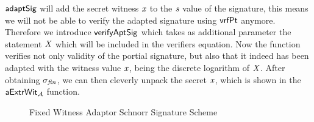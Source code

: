 $\mathsf{adaptSig}$ will add the secret witness $\mathit{x}$ to the $\mathit{s}$ value of the signature, this means we will not be able to verify the adapted signature using $\mathsf{vrfPt}$ anymore. Therefore we
introduce $\mathsf{verifyAptSig}$ which takes as additional parameter the statement $\mathit{X}$ which will be included in the verifiers equation. Now the function verifies not only validity of the portial
signature, but also that it indeed has been adapted with the witness value $\mathit{x}$, being the discrete logarithm of $\mathit{X}$. After obtaining $\sigma_{\mathit{fin}}$, we can then cleverly unpack the secret $\mathit{x}$,
which is shown in the $\mathsf{aExtrWit_{\mathcal{A}}}$ function.

\begin{figure}
    \begin{center}
        \fbox{
        \begin{varwidth}{\textwidth}
            \procedure[linenumbering]{$\procAptSig{\varSigPt}{\varWit}$}{
            (\varS \opSeperate \varRandAlice \opSeperate \varSigContext) \opFunResult \varSigPt \\
            \varSStar \opAssign \varS \opAddScalar \varWit \\
            \pcreturn \varSigApt \opAssign (\varSStar \opSeperate \varRandAlice \opSeperate \varSigContext)
            } \\
            \procedure[linenumbering]{$\procVerifyAptSig{\varSigAptAlice}{\varMsg}{\varPubKeyAlice}{\varStatement}$} {
            (\varSAlice \opSeperate \varRandAlice \opSeperate \varSigContext) \opFunResult \varSigAptAlice \\
            (\varPubKey \opSeperate \varRand) \opFunResult \varSigContext \\
            \varSchnorrChallenge \opAssign \funHash{\varMsg \opConc \varRand \opConc \varPubKey} \\
            \pcreturn \funGen{\varSAlice} \opEq \varRandAlice \opAddPoint \opPointScalar{\varPubKeyAlice}{\varSchnorrChallenge} \opAddPoint \varStatement
            }
            \procedure[linenumbering]{$\procExtWit{\varSigFin}{\varSigAlice}{\varSigAptBob}$}{
            (\varS \opSeperate \varRand) \opFunResult \varSigFin \\
            (\varSAlice \opSeperate \varRandAlice \opSeperate \varSigContext) \opFunResult \varSigAlice \\
            (\varSAptBob \opSeperate \varRandBob \opSeperate \varSigContext) \opFunResult \varSigAptBob \\
            \varSBob \opAssign \varS \opSub \varSAlice \\
            \varWit \opAssign \varSAptBob \opSub \varSBob \\
            \pcreturn (\varWit)
            }
        \end{varwidth}
        }
    \end{center}
    \caption{Fixed Witness Adaptor Schnorr Signature Scheme}
    \label{fig:aptSchnorr}
\end{figure}

